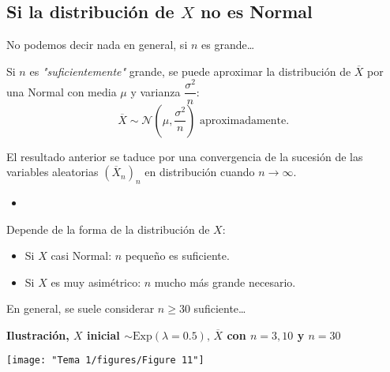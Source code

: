 \subsection{Si la distribución de $X$ no es Normal}
No podemos decir nada en general,  si $n$ es grande\dots
\begin{tcolorbox}[colback=blue!5!white, colframe=blue!75!black, title=\textbf{Teorema Central del Límite}]
  Si $n$ es \textit{"suficientemente"} grande, se puede aproximar la distribución de $\overline{X}$ por una Normal con media  $\mu$ y varianza $\dfrac{\sigma^2}{n}$: \[
    \overline{X}\sim \mathcal{N}\left( \mu,\dfrac{\sigma^2}{n} \right) \text{ aproximadamente. }
  \]  
\end{tcolorbox}
\begin{tcolorbox}[colback=blue!5!white, colframe=blue!75!black, title=\textbf{Formulación matemática}]
  El resultado anterior se taduce por una convergencia de la sucesión de las variables aleatorias $\left( \overline{X}_n \right)_n $ en distribución cuando $n\to \infty$.
\end{tcolorbox}
\begin{itemize}[label=\color{red}\textbullet, leftmargin=*]
  \item {}
\end{itemize}
Depende de la forma de la distribución de $X$:
 \begin{itemize}[label=\textbullet]
  \item Si $X$ casi Normal: $n$ pequeño es suficiente.
  \item Si $X$ es muy asimétrico: $n$ mucho más grande necesario.
\end{itemize}
En general, se suele considerar $n\ge 30$ suficiente\dots

\textbf{Ilustración, $X$ inicial $\sim \mathrm{Exp}(\lambda=0.5),\,\overline{X}$ con $n=3,10$ y  $n=30$}
\begin{center}
  \texttt{[image: "Tema 1/figures/Figure 11"]}
\end{center}

